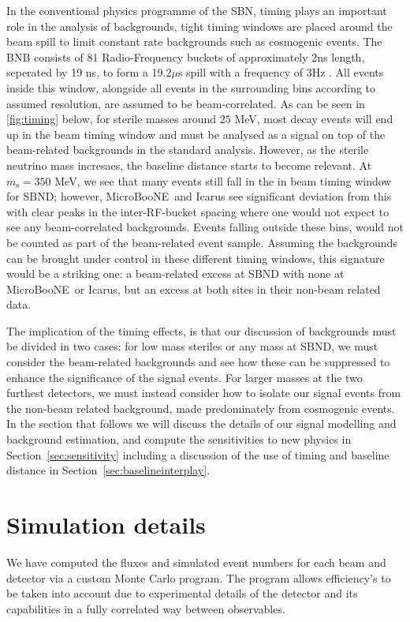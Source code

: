\documentclass[11pt, a4paper]{article}
\newcommand{\refsec}[1]{Section~\ref{#1}}
\def\muboone{MicroBooNE}
\begin{document}
In the conventional physics programme of the SBN, timing plays an important
role in the analysis of backgrounds, tight timing windows are placed around the
beam spill to limit constant rate backgrounds such as cosmogenic events. The
BNB consists of 81 Radio-Frequency buckets of approximately 2ns length,
seperated by 19 ns, to form a 19.2$\mu$s spill with a frequency of 3Hz
\cite{Antonello:2015ea}.  All events inside this window, alongside all events
in the surrounding bins according to assumed resolution, are assumed to be
beam-correlated.  As can be seen in \ref{fig:timing} below, for sterile masses
around $25$ MeV, most decay events will end up in the beam timing window and
must be analysed as a signal on top of the beam-related backgrounds in the
standard analysis. However, as the sterile neutrino mass incresaes, the
baseline distance starts to become relevant. At $m_{\text{s}}=350$ MeV, we see
that many events still fall in the in beam timing window for SBND; however,
\muboone\ and Icarus see significant deviation from this with clear peaks in
the inter-RF-bucket spacing where one would not expect to see any
beam-correlated backgrounds. Events falling outside these bins, would not be
counted as part of the beam-related event sample. Assuming the backgrounds can
be brought under control in these different timing windows, this signature
would be a striking one: a beam-related excess at SBND with none at \muboone\
or Icarus, but an excess at both sites in their non-beam related data.

The implication of the timing effects, is that our discussion of backgrounds
must be divided in two cases: for low mass steriles or any mass at SBND, we
must consider the beam-related backgrounds and see how these can be suppressed
to enhance the significance of the signal events. For larger masses at the two
furthest detectors, we must instead consider how to isolate our signal events
from the non-beam related background, made predominately from cosmogenic
events. In the section that follows we will discuss the details of our signal
modelling and background estimation, and compute the sensitivities to new
physics in \refsec{sec:sensitivity} including a discussion of the 
use of timing and baseline distance in \refsec{sec:baselineinterplay}. 

\section{Simulation details}

We have computed the fluxes and simulated event numbers for each beam and
detector via a custom Monte Carlo program. The program allows efficiency's to
be taken into account due to experimental details of the detector and its
capabilities in a fully correlated way between observables. 
\end{document}
